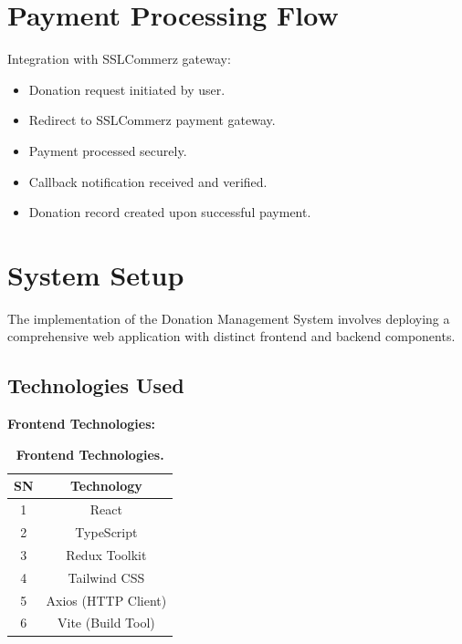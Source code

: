 \section{Payment Processing Flow}
Integration with SSLCommerz gateway:
\begin{itemize}
    \item Donation request initiated by user.
    \item Redirect to SSLCommerz payment gateway.
    \item Payment processed securely.
    \item Callback notification received and verified.
    \item Donation record created upon successful payment.
\end{itemize}


\section{System Setup}
The implementation of the Donation Management System involves deploying a comprehensive web application with distinct frontend and backend components.

\subsection{Technologies Used}

\textbf{Frontend Technologies:}
\vspace{5pt}
\begin{table}[H]
    \centering
    \caption{\textbf{Frontend Technologies.}}
    \vspace{10pt}
    \begin{tabular}{|c|c|}
        \hline
        \textbf{SN} & \textbf{Technology} \\
        \hline
        1  & React \\
        2  & TypeScript \\
        3  & Redux Toolkit \\
        4  & Tailwind CSS \\
        5  & Axios (HTTP Client) \\
        6  & Vite (Build Tool) \\
        \hline
    \end{tabular}
\end{table}
\vspace{10}

